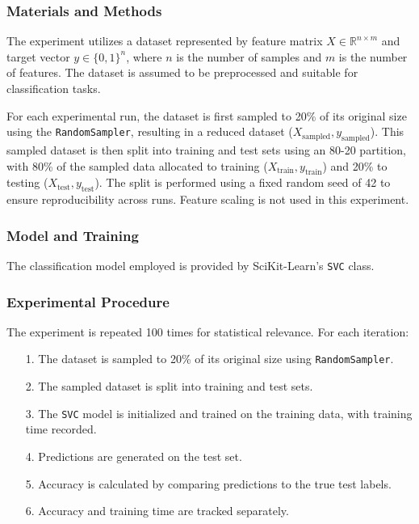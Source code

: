 \documentclass{article}
\theoremstyle{plain}
\theoremstyle{definition}
\theoremstyle{remark}
\begin{document}
\subsubsection{Materials and Methods}

The experiment utilizes a dataset represented by feature matrix $ X \in \mathbb{R}^{n \times m} $ and target vector $ y \in \{0, 1\}^n $, where $ n $ is the number of samples and $ m $ is the number of features. The dataset is assumed to be preprocessed and suitable for classification tasks.

For each experimental run, the dataset is first sampled to 20\% of its original size using the \texttt{RandomSampler}, resulting in a reduced dataset ($ X_{\text{sampled}}, y_{\text{sampled}} $). This sampled dataset is then split into training and test sets using an 80-20 partition, with 80\% of the sampled data allocated to training ($ X_{\text{train}}, y_{\text{train}} $) and 20\% to testing ($ X_{\text{test}}, y_{\text{test}} $). The split is performed using a fixed random seed of 42 to ensure reproducibility across runs. Feature scaling is not used in this experiment.

\subsubsection{Model and Training}

The classification model employed is provided by SciKit-Learn's \texttt{SVC} class.

\subsubsection{Experimental Procedure}

The experiment is repeated 100 times for statistical relevance. For each iteration:

\begin{itemize}
	\item [1.] The dataset is sampled to 20\% of its original size using \texttt{RandomSampler}.
	\item [2.] The sampled dataset is split into training and test sets.
	\item [3.] The \texttt{SVC} model is initialized and trained on the training data, with training time recorded.
	\item [4.] Predictions are generated on the test set.
	\item [5.] Accuracy is calculated by comparing predictions to the true test labels.
	\item [6.] Accuracy and training time are tracked separately.
\end{itemize}
\end{document}
